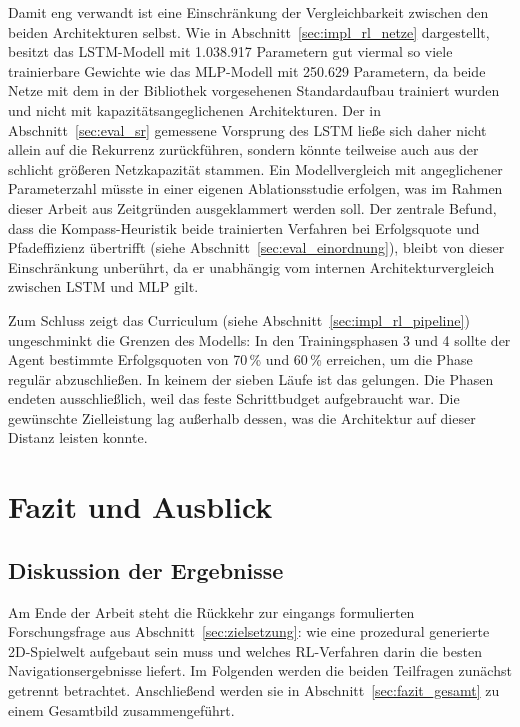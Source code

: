 \documentclass[
  a4paper,
  11pt,
  twoside,
  BCOR=8mm,           %
  headings=big,
  numbers=noenddot,
  listof=totoc,       %
  captions=tableheading,
]{scrreprt}
\begin{document}
Damit eng verwandt ist eine Einschränkung der Vergleichbarkeit zwischen den beiden Architekturen selbst. Wie in Abschnitt~\ref{sec:impl_rl_netze} dargestellt, besitzt das LSTM-Modell mit 1.038.917 Parametern gut viermal so viele trainierbare Gewichte wie das MLP-Modell mit 250.629 Parametern, da beide Netze mit dem in der Bibliothek vorgesehenen Standardaufbau trainiert wurden und nicht mit kapazitätsangeglichenen Architekturen. Der in Abschnitt~\ref{sec:eval_sr} gemessene Vorsprung des LSTM ließe sich daher nicht allein auf die Rekurrenz zurückführen, sondern könnte teilweise auch aus der schlicht größeren Netzkapazität stammen. Ein Modellvergleich mit angeglichener Parameterzahl müsste in einer eigenen Ablationsstudie erfolgen, was im Rahmen dieser Arbeit aus Zeitgründen ausgeklammert werden soll. Der zentrale Befund, dass die Kompass-Heuristik beide trainierten Verfahren bei Erfolgsquote und Pfadeffizienz übertrifft (siehe Abschnitt~\ref{sec:eval_einordnung}), bleibt von dieser Einschränkung unberührt, da er unabhängig vom internen Architekturvergleich zwischen LSTM und MLP gilt.

Zum Schluss zeigt das Curriculum (siehe Abschnitt~\ref{sec:impl_rl_pipeline}) ungeschminkt die Grenzen des Modells: In den Trainingsphasen 3 und 4 sollte der Agent bestimmte Erfolgsquoten von 70\,\% und 60\,\% erreichen, um die Phase regulär abzuschließen. In keinem der sieben Läufe ist das gelungen. Die Phasen endeten ausschließlich, weil das feste Schrittbudget aufgebraucht war. Die gewünschte Zielleistung lag außerhalb dessen, was die Architektur auf dieser Distanz leisten konnte.

\chapter{Fazit und Ausblick}
\label{chap:fazit}

\section{Diskussion der Ergebnisse}
\label{sec:fazit_ergebnisse}
Am Ende der Arbeit steht die Rückkehr zur eingangs formulierten Forschungsfrage aus Abschnitt~\ref{sec:zielsetzung}: wie eine prozedural generierte 2D-Spielwelt aufgebaut sein muss und welches RL-Verfahren darin die besten Navigationsergebnisse liefert. Im Folgenden werden die beiden Teilfragen zunächst getrennt betrachtet. Anschließend werden sie in Abschnitt~\ref{sec:fazit_gesamt} zu einem Gesamtbild zusammengeführt.
\end{document}

